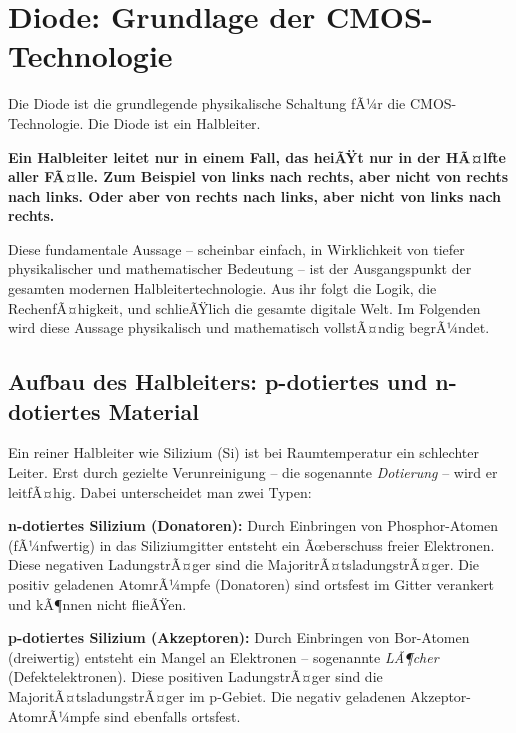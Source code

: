 ﻿\documentclass[12pt, a4paper]{article}
\begin{document}
	\section[Diode: Grundlage der CMOS-Technologie]{Diode: Grundlage der CMOS-Technologie}
	
	Die Diode ist die grundlegende physikalische Schaltung fÃ¼r die
	CMOS-Technologie. Die Diode ist ein Halbleiter.
	
	\textbf{Ein Halbleiter leitet nur in einem Fall, das heiÃŸt nur in der
		HÃ¤lfte aller FÃ¤lle. Zum Beispiel von links nach rechts, aber nicht von rechts
		nach links. Oder aber von rechts nach links, aber nicht von links nach rechts.}
	
	Diese fundamentale Aussage -- scheinbar einfach, in Wirklichkeit von tiefer
	physikalischer und mathematischer Bedeutung -- ist der Ausgangspunkt der
	gesamten modernen Halbleitertechnologie. Aus ihr folgt die Logik, die
	RechenfÃ¤higkeit, und schlieÃŸlich die gesamte digitale Welt. Im Folgenden wird
	diese Aussage physikalisch und mathematisch vollstÃ¤ndig begrÃ¼ndet.
	
	\subsection{Aufbau des Halbleiters: p-dotiertes und n-dotiertes Material}
	
	Ein reiner Halbleiter wie Silizium (Si) ist bei Raumtemperatur ein schlechter
	Leiter. Erst durch gezielte Verunreinigung -- die sogenannte \textit{Dotierung}
	-- wird er leitfÃ¤hig. Dabei unterscheidet man zwei Typen:
	
	\textbf{n-dotiertes Silizium (Donatoren):} Durch Einbringen von
	Phosphor-Atomen (fÃ¼nfwertig) in das Siliziumgitter entsteht ein Ãœberschuss
	freier Elektronen. Diese negativen LadungstrÃ¤ger sind die MajoritrÃ¤tsladungstrÃ¤ger.
	Die positiv geladenen AtomrÃ¼mpfe (Donatoren) sind ortsfest im Gitter verankert
	und kÃ¶nnen nicht flieÃŸen.
	
	\textbf{p-dotiertes Silizium (Akzeptoren):} Durch Einbringen von Bor-Atomen
	(dreiwertig) entsteht ein Mangel an Elektronen -- sogenannte
	\textit{LÃ¶cher} (Defektelektronen). Diese positiven LadungstrÃ¤ger sind die
	MajoritÃ¤tsladungstrÃ¤ger im p-Gebiet. Die negativ geladenen Akzeptor-AtomrÃ¼mpfe
	sind ebenfalls ortsfest.
	
\end{document}
